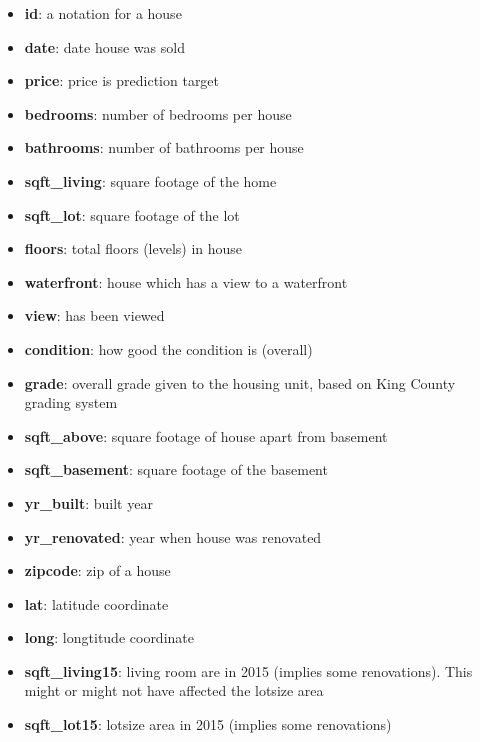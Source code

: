 \documentclass[]{article}
\providecommand{\tightlist}{%
  \setlength{\itemsep}{0pt}\setlength{\parskip}{0pt}}
\begin{document}
\begin{itemize}
\tightlist
\item
  \textbf{id}: a notation for a house\\
\item
  \textbf{date}: date house was sold\\
\item
  \textbf{price}: price is prediction target\\
\item
  \textbf{bedrooms}: number of bedrooms per house\\
\item
  \textbf{bathrooms}: number of bathrooms per house\\
\item
  \textbf{sqft\_living}: square footage of the home\\
\item
  \textbf{sqft\_lot}: square footage of the lot\\
\item
  \textbf{floors}: total floors (levels) in house\\
\item
  \textbf{waterfront}: house which has a view to a waterfront\\
\item
  \textbf{view}: has been viewed\\
\item
  \textbf{condition}: how good the condition is (overall)\\
\item
  \textbf{grade}: overall grade given to the housing unit, based on King
  County grading system\\
\item
  \textbf{sqft\_above}: square footage of house apart from basement\\
\item
  \textbf{sqft\_basement}: square footage of the basement\\
\item
  \textbf{yr\_built}: built year
\item
  \textbf{yr\_renovated}: year when house was renovated\\
\item
  \textbf{zipcode}: zip of a house\\
\item
  \textbf{lat}: latitude coordinate\\
\item
  \textbf{long}: longtitude coordinate\\
\item
  \textbf{sqft\_living15}: living room are in 2015 (implies some
  renovations). This might or might not have affected the lotsize area\\
\item
  \textbf{sqft\_lot15}: lotsize area in 2015 (implies some renovations)
\end{itemize}
\end{document}
